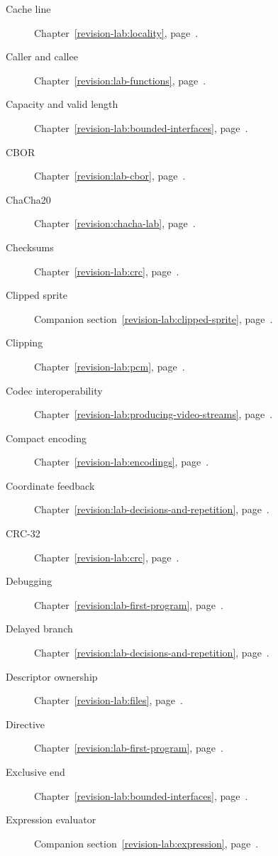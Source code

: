 \begin{description}
  \item[Cache line] Chapter~\ref{revision-lab:locality}, page~\pageref{revision-lab:locality}.
  \item[Caller and callee] Chapter~\ref{revision:lab-functions}, page~\pageref{revision:lab-functions}.
  \item[Capacity and valid length] Chapter~\ref{revision-lab:bounded-interfaces}, page~\pageref{revision-lab:bounded-interfaces}.
  \item[CBOR] Chapter~\ref{revision:lab-cbor}, page~\pageref{revision:lab-cbor}.
  \item[ChaCha20] Chapter~\ref{revision:chacha-lab}, page~\pageref{revision:chacha-lab}.
  \item[Checksums] Chapter~\ref{revision-lab:crc}, page~\pageref{revision-lab:crc}.
  \item[Clipped sprite] Companion section~\ref{revision-lab:clipped-sprite}, page~\pageref{revision-lab:clipped-sprite}.
  \item[Clipping] Chapter~\ref{revision-lab:pcm}, page~\pageref{revision-lab:pcm}.
  \item[Codec interoperability] Chapter~\ref{revision-lab:producing-video-streams}, page~\pageref{revision-lab:producing-video-streams}.
  \item[Compact encoding] Chapter~\ref{revision-lab:encodings}, page~\pageref{revision-lab:encodings}.
  \item[Coordinate feedback] Chapter~\ref{revision:lab-decisions-and-repetition}, page~\pageref{revision:lab-decisions-and-repetition}.
  \item[CRC-32] Chapter~\ref{revision-lab:crc}, page~\pageref{revision-lab:crc}.
  \item[Debugging] Chapter~\ref{revision:lab-first-program}, page~\pageref{revision:lab-first-program}.
  \item[Delayed branch] Chapter~\ref{revision:lab-decisions-and-repetition}, page~\pageref{revision:lab-decisions-and-repetition}.
  \item[Descriptor ownership] Chapter~\ref{revision-lab:files}, page~\pageref{revision-lab:files}.
  \item[Directive] Chapter~\ref{revision:lab-first-program}, page~\pageref{revision:lab-first-program}.
  \item[Exclusive end] Chapter~\ref{revision-lab:bounded-interfaces}, page~\pageref{revision-lab:bounded-interfaces}.
  \item[Expression evaluator] Companion section~\ref{revision-lab:expression}, page~\pageref{revision-lab:expression}.

\end{description}
